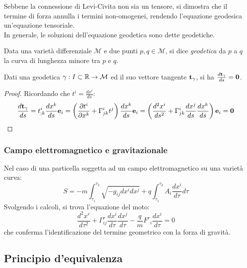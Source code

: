 Sebbene la connessione di Levi-Civita non sia un tensore, si dimostra che il termine di forza annulla i termini non-omogenei, rendendo l'equazione geodesica un'equazione tensoriale.\\
In generale, le soluzioni dell'equazione geodetica sono dette geodetiche.
\begin{definition}
	Data una varietà differenziale $ \mathcal{M} $ e due punti $ p,q\in\mathcal{M} $, si dice \textit{geodetica} da $ p $ a $ q $ la curva di lunghezza minore tra $ p $ e $ q $.
\end{definition}
\begin{proposition}
	Dati una geodetica $ \gamma : I \subset \mathbb{R} \rightarrow \mathcal{M} $ ed il suo vettore tangente $ \mathbf{t}_{\gamma} $, si ha $ \frac{d\mathbf{t}_{\gamma}}{ds} = \mathbf{0} $.
\end{proposition}
\begin{proof}
	Ricordando che $ t^i = \frac{dx^i}{ds} $:
	\begin{equation*}
		\frac{d\mathbf{t}_{\gamma}}{ds} = t^i_{;k} \frac{dx^k}{ds} \mathbf{e}_i = \left( \frac{\partial t^i}{\partial x^k} + \Gamma^i_{jk} t^j \right) \frac{dx^k}{ds} \mathbf{e}_i = \left( \frac{d^2 x^i}{ds^2} + \Gamma^i_{jk} \frac{dx^j}{ds} \frac{dx^k}{ds} \right) \mathbf{e}_i = \mathbf{0}
	\end{equation*}
\end{proof}

\subsubsection{Campo elettromagnetico e gravitazionale}

Nel caso di una particella soggetta ad un campo elettromagnetico su una varietà curva:
\begin{equation}
	S = -m \int_{\tau_1}^{\tau_2} \sqrt{- g_{ij} dx^i dx^j} + q \int_{\tau_1}^{\tau_2} A_i \frac{dx^i}{d\tau} d\tau
	\label{eq:5.13}
\end{equation}
Svolgendo i calcoli, si trova l'equazione del moto:
\begin{equation}
	\frac{d^2 x^r}{d\tau^2} + \Gamma^r_{ij} \frac{dx^i}{d\tau} \frac{dx^j}{d\tau} - \frac{q}{m} F^r_{\,\,\,i} \frac{dx^i}{d\tau} = 0
	\label{eq:5.14}
\end{equation}
che conferma l'identificazione del termine geometrico con la forza di gravità.

\subsection{Principio d'equivalenza}

